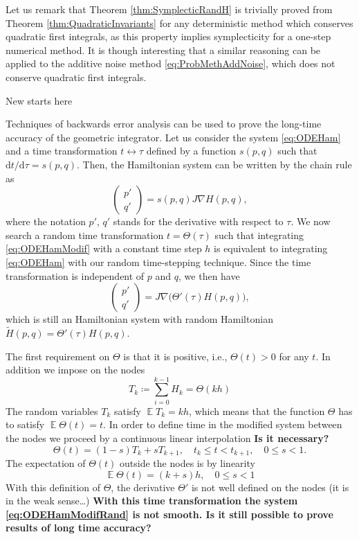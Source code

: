 \documentclass{siamart1116}
\numberwithin{theorem}{section}
\newcommand{\defeq}{\coloneqq}
\newcommand{\E}{\operatorname{\mathbb{E}}}
\newcommand{\sksum}{\textstyle\sum}
\newcommand{\dd}{\mathrm{d}}
\begin{document}
Let us remark that Theorem \ref{thm:SymplecticRandH} is trivially proved from Theorem \ref{thm:QuadraticInvariants} for any deterministic method which conserves quadratic first integrals, as this property implies symplecticity for a one-step numerical method. It is though interesting that a similar reasoning can be applied to the additive noise method \eqref{eq:ProbMethAddNoise}, which does not conserve quadratic first integrals.

{\color{red} New starts here}

Techniques of backwards error analysis can be used to prove the long-time accuracy of the geometric integrator. Let us consider the system \eqref{eq:ODEHam} and a time transformation $t \leftrightarrow \tau$ defined by a function $s(p, q)$ such that $\dd t / \dd \tau = s(p, q)$. Then, the Hamiltonian system can be written by the chain rule as
\begin{equation}\label{eq:ODEHamModif}
	\begin{pmatrix} p' \\ q' \end{pmatrix} = s(p, q) J \nabla H(p, q),
\end{equation}
where the notation $p'$, $q'$ stands for the derivative with respect to $\tau$. We now search a random time transformation $t = \Theta(\tau)$ such that integrating \eqref{eq:ODEHamModif} with a constant time step $h$ is equivalent to integrating \eqref{eq:ODEHam} with our random time-stepping technique. Since the time transformation is independent of $p$ and $q$, we then have
\begin{equation}\label{eq:ODEHamModifRand}
	\begin{pmatrix} p' \\ q' \end{pmatrix} = J \nabla \big(\Theta'(\tau) H(p, q)\big),
\end{equation} 
which is still an Hamiltonian system with random Hamiltonian $\tilde H(p, q) = \Theta'(\tau) H(p, q)$.
 
The first requirement on $\Theta$ is that it is positive, i.e., $\Theta(t) > 0$ for any $t$. In addition we impose on the nodes
\begin{equation}
	T_k \defeq \sksum_{i=0}^{k-1}H_k = \Theta (kh)
\end{equation}
The random variables $T_k$ satisfy $\E T_k = kh$, which means that the function $\Theta$ has to satisfy $\E \Theta(t) = t$. In order to define time in the modified system between the nodes we proceed by a continuous linear interpolation \textbf{\color{red} Is it necessary?}
\begin{equation}
	\Theta (t) =(1 - s) T_k + sT_{k+1}, \quad t_k \leq t < t_{k+1}, \quad 0 \leq s < 1.
\end{equation}
The expectation of $\Theta(t)$ outside the nodes is by linearity
\begin{equation}
	\E \Theta(t) = (k + s) h , \quad 0 \leq s < 1
\end{equation}
With this definition of $\Theta$, the derivative $\Theta'$ is not well defined on the nodes (it is in the weak sense\ldots) 
\textbf{\color{red} With this time transformation the system \eqref{eq:ODEHamModifRand} is not smooth. Is it still possible to prove results of long time accuracy?}
\end{document}
